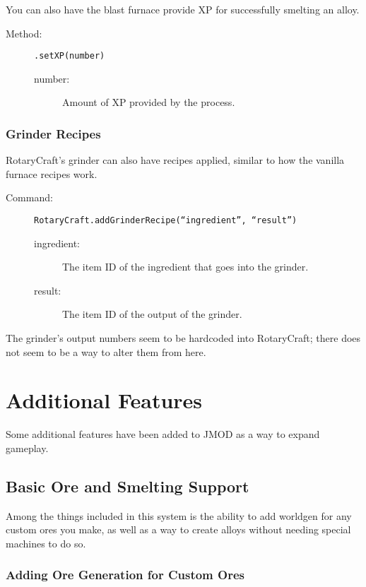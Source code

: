 \documentclass[letterpaper,titlepage,12pt]{article}
\begin{document}
You can also have the blast furnace provide XP for successfully smelting an alloy.

\begin{description}
\item[Method:] \texttt{.setXP(number)}
\begin{description}
\item [number:] Amount of XP provided by the process.
\end{description}
\end{description}

\subsubsection{Grinder Recipes}

RotaryCraft's grinder can also have recipes applied, similar to how the vanilla furnace recipes work.

\begin{description}
\item[Command:] \texttt{RotaryCraft.addGrinderRecipe(``ingredient'', ``result'')}
\begin{description}
\item [ingredient:] The item ID of the ingredient that goes into the grinder.
\item [result:] The item ID of the output of the grinder.
\end{description}
\end{description}

The grinder's output numbers seem to be hardcoded into RotaryCraft; there does not seem to be a way to alter them from here.

\section{Additional Features}

Some additional features have been added to JMOD as a way to expand gameplay.

\subsection{Basic Ore and Smelting Support}

Among the things included in this system is the ability to add worldgen for any custom ores you make, as well as a way to create alloys without needing special machines to do so.

\subsubsection{Adding Ore Generation for Custom Ores}
\end{document}
